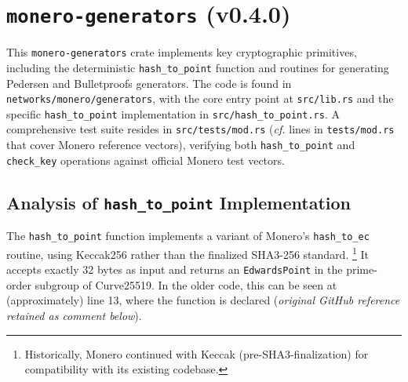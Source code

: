 \documentclass[12pt,a4paper]{article}
\begin{document}
\section{\texttt{monero-generators} (v0.4.0)}
\label{sec:monero-generators}

This \texttt{monero-generators} crate implements key cryptographic primitives, including the deterministic \texttt{hash\_to\_point} function and routines for generating Pedersen and Bulletproofs generators. The code is found in \texttt{networks/monero/generators}, with the core entry point at \texttt{src/lib.rs} and the specific \texttt{hash\_to\_point} implementation in \texttt{src/hash\_to\_point.rs}. A comprehensive test suite resides in \texttt{src/tests/mod.rs} (\textit{cf.} lines in \texttt{tests/mod.rs} that cover Monero reference vectors), verifying both \texttt{hash\_to\_point} and \texttt{check\_key} operations against official Monero test vectors.

\subsection{Analysis of \texttt{hash\_to\_point} Implementation}

The \texttt{hash\_to\_point} function implements a variant of Monero’s \texttt{hash\_to\_ec} routine, using Keccak256 rather than the finalized SHA3-256 standard.%
\footnote{Historically, Monero continued with Keccak (pre-SHA3-finalization) for compatibility with its existing codebase.}
It accepts exactly 32 bytes as input and returns an \texttt{EdwardsPoint} in the prime-order subgroup of Curve25519. In the older code, this can be seen at (approximately) line 13, where the function is declared (\emph{original GitHub reference retained as comment below}).
\par
\end{document}
